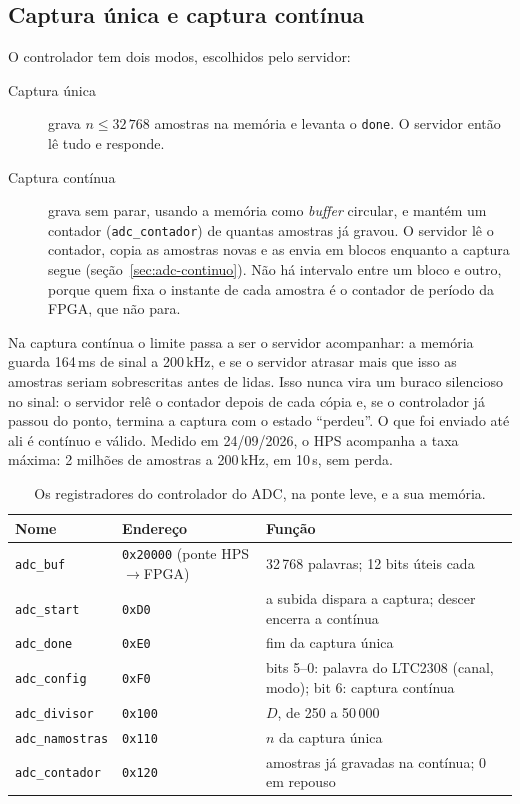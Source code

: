 \subsection{Captura única e captura contínua}

O controlador tem dois modos, escolhidos pelo servidor:

\begin{description}
  \item[Captura única] grava \(n \le 32\,768\) amostras na memória e levanta o
    \texttt{done}. O servidor então lê tudo e responde.
  \item[Captura contínua] grava sem parar, usando a memória como
    \emph{buffer} circular, e mantém um contador (\texttt{adc\_contador}) de
    quantas amostras já gravou. O servidor lê o contador, copia as amostras
    novas e as envia em blocos enquanto a captura segue
    (seção~\ref{sec:adc-continuo}). Não há intervalo entre um bloco e outro,
    porque quem fixa o instante de cada amostra é o contador de período da
    FPGA, que não para.
\end{description}

Na captura contínua o limite passa a ser o servidor acompanhar: a memória
guarda 164\,ms de sinal a 200\,kHz, e se o servidor atrasar mais que isso as
amostras seriam sobrescritas antes de lidas. Isso nunca vira um buraco
silencioso no sinal: o servidor relê o contador depois de cada cópia e, se o
controlador já passou do ponto, termina a captura com o estado ``perdeu''. O
que foi enviado até ali é contínuo e válido. Medido em 24/09/2026, o HPS
acompanha a taxa máxima: 2 milhões de amostras a 200\,kHz, em 10\,s, sem perda.

\begin{table}[htbp]
  \centering
  \small
  \caption{Os registradores do controlador do ADC, na ponte leve, e a sua
    memória.}
  \label{tab:adc-regs}
  \begin{tabularx}{\textwidth}{@{}llX@{}}
    \toprule
    \textbf{Nome} & \textbf{Endereço} & \textbf{Função} \\
    \midrule
    \texttt{adc\_buf} & \texttt{0x20000} (ponte HPS\(\to\)FPGA) & 32\,768
      palavras; 12 bits úteis cada \\
    \texttt{adc\_start} & \texttt{0xD0} & a subida dispara a captura; descer
      encerra a contínua \\
    \texttt{adc\_done} & \texttt{0xE0} & fim da captura única \\
    \texttt{adc\_config} & \texttt{0xF0} & bits 5--0: palavra do LTC2308
      (canal, modo); bit 6: captura contínua \\
    \texttt{adc\_divisor} & \texttt{0x100} & \(D\), de 250 a 50\,000 \\
    \texttt{adc\_namostras} & \texttt{0x110} & \(n\) da captura única \\
    \texttt{adc\_contador} & \texttt{0x120} & amostras já gravadas na contínua;
      0 em repouso \\
    \bottomrule
  \end{tabularx}
\end{table}

